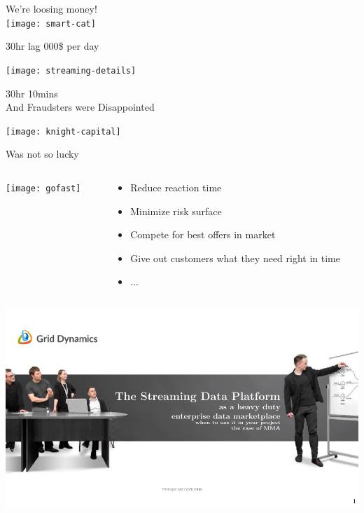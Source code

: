\documentclass[aspectratio=169, 15pt,usenames,dvipsnames]{beamer}
\begin{document}
\begin{gdsw}
	\centering\Large We're loosing money!\\
	\texttt{[image: smart-cat]} 
	\par\centering
	\pause
	30hr lag  000\$ per day
\end{gdsw}
\begin{gdsw}
\end{gdsw}	
\begin{gdsw}
\end{gdsw}
\begin{gdsw}
	\centering\texttt{[image: streaming-details]} 
	\par\pause\Large
	30hr \rightarrow \Rightarrow 10mins\\
	And Fraudsters were Disappointed
\end{gdsw}
\begin{gdsw}
	\centering\texttt{[image: knight-capital]} 
	\par
	Was not so lucky
\end{gdsw}
\begin{gdsw}		
	\begin{columns}
		\begin{column}{0.4\textwidth}
			\centering\texttt{[image: gofast]} 
		\end{column}
		\begin{column}{0.6\textwidth}
			\large\centering 
			\begin{itemize}
				\item Reduce reaction time
				\item Minimize risk surface
				\item Compete for best offers in market
				\item Give out customers what they need right in time
				\item ...
			\end{itemize}	
		\end{column}
	\end{columns}
\end{gdsw}
\begin{gdsw}
	\centering\includegraphics[height=\textheight]{sdp}         
\end{gdsw}
\end{document}
